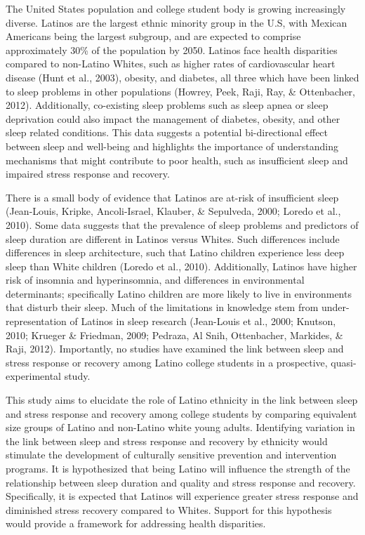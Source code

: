 \documentclass[man, fleqn, noextraspace]{apa6}
\begin{document}
The United States population and college student body is growing increasingly diverse. Latinos are the largest ethnic minority group in the U.S, with Mexican Americans being the largest subgroup, and are expected to comprise approximately 30\% of the population by 2050. Latinos face health disparities compared to non-Latino Whites, such as higher rates of cardiovascular heart disease (Hunt et al., 2003), obesity, and diabetes, all three which have been linked to sleep problems in other populations (Howrey, Peek, Raji, Ray, \& Ottenbacher, 2012). Additionally, co-existing sleep problems such as sleep apnea or sleep deprivation could also impact the management of diabetes, obesity, and other sleep related conditions. This data suggests a potential bi-directional effect between sleep and well-being and highlights the importance of understanding mechanisms that might contribute to poor health, such as insufficient sleep and impaired stress response and recovery.

There is a small body of evidence that Latinos are at-risk of insufficient sleep (Jean-Louis, Kripke, Ancoli-Israel, Klauber, \& Sepulveda, 2000; Loredo et al., 2010). Some data suggests that the prevalence of sleep problems and predictors of sleep duration are different in Latinos versus Whites. Such differences include differences in sleep architecture, such that Latino children experience less deep sleep than White children (Loredo et al., 2010). Additionally, Latinos have higher risk of insomnia and hyperinsomnia, and differences in environmental determinants; specifically Latino children are more likely to live in environments that disturb their sleep. Much of the limitations in knowledge stem from under-representation of Latinos in sleep research (Jean-Louis et al., 2000; Knutson, 2010; Krueger \& Friedman, 2009; Pedraza, Al Snih, Ottenbacher, Markides, \& Raji, 2012). Importantly, no studies have examined the link between sleep and stress response or recovery among Latino college students in a prospective, quasi-experimental study.

This study aims to elucidate the role of Latino ethnicity in the link between sleep and stress response and recovery among college students by comparing equivalent size groups of Latino and non-Latino white young adults. Identifying variation in the link between sleep and stress response and recovery by ethnicity would stimulate the development of culturally sensitive prevention and intervention programs. It is hypothesized that being Latino will influence the strength of the relationship between sleep duration and quality and stress response and recovery. Specifically, it is expected that Latinos will experience greater stress response and diminished stress recovery compared to Whites. Support for this hypothesis would provide a framework for addressing health disparities.
\end{document}
